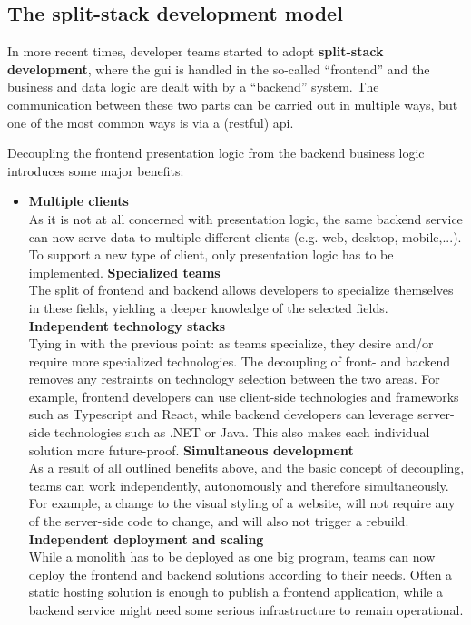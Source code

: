 \subsection{The split-stack development model}
\label{ssec:split-stack}


In more recent times, developer teams started to adopt \textbf{split-stack
development}, where the \gls{gui} is handled in the so-called ``\gls{frontend}'' and
the business and data logic are dealt with by a ``\gls{backend}'' system. The
communication between these two parts can be carried out in multiple ways, but
one of the most common ways is via a (\gls{restful}) \gls{api}.

Decoupling the \gls{frontend} presentation logic from the \gls{backend} business logic
introduces some major benefits: \autocite{Dunkley_2016}
\begin{itemize}
    \item \textbf{Multiple clients}\\
    As it is not at all concerned with presentation logic, the same
    \gls{backend} service can now serve data to multiple different clients (e.g.
    web, desktop, mobile,...). To support a new type of client, only
    presentation logic has to be implemented.
    \spacedItem  \textbf{Specialized teams}\\
    The split of \gls{frontend} and \gls{backend} allows developers to
    specialize themselves in these fields, yielding a deeper knowledge of the
    selected fields. 
    \spacedItem  \textbf{Independent technology stacks}\\
    Tying in with the previous point: as teams specialize, they desire and/or
    require more specialized technologies. The decoupling of front- and
    \gls{backend} removes any restraints on technology selection between the two
    areas. For example, \gls{frontend} developers can use client-side
    technologies and frameworks such as Typescript and React, while
    \gls{backend} developers can leverage server-side technologies such as .NET
    or Java. This also makes each individual solution more future-proof.
    \spacedItem  \textbf{Simultaneous development}\\
    As a result of all outlined benefits above, and the basic concept of
    decoupling, teams can work independently, autonomously and therefore
    simultaneously. For example, a change to the visual styling of a website,
    will not require any of the server-side code to change, and will also not
    trigger a rebuild. 
    \spacedItem  \textbf{Independent deployment and scaling}\\
    While a \gls{monolith} has to be deployed as one big program, teams can now
    deploy the \gls{frontend} and \gls{backend} solutions according to their
    needs. Often a static hosting solution is enough to publish a \gls{frontend}
    application, while a \gls{backend} service might need some serious
    infrastructure to remain operational.
\end{itemize}


